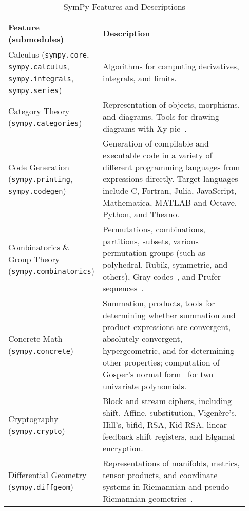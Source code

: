\begin{longtable}[htbc]{>{\raggedright}p{0.30\linewidth}p{0.63\linewidth}}
\caption{SymPy Features and Descriptions\label{features-table}}\\
\toprule
\textbf{Feature (submodules)} & \textbf{Description} \\
\midrule
Calculus (\texttt{sympy.core}, \texttt{sympy.calculus}, \texttt{sympy.integrals}, \texttt{sympy.series}) & Algorithms for computing derivatives, integrals, and limits.\\

Category Theory (\texttt{sympy.categories}) & Representation of objects, morphisms, and diagrams. Tools
for drawing diagrams with Xy-pic~\cite{rose1999xy}.\\

Code Generation (\texttt{sympy.printing}, \texttt{sympy.codegen}) & Generation of compilable and executable code in a
variety of different programming languages from expressions directly. Target
languages include C, Fortran, Julia, JavaScript,
Mathematica, MATLAB and Octave, Python, and Theano.\\

Combinatorics \& Group Theory (\texttt{sympy.combinatorics}) & Permutations, combinations,
partitions, subsets, various permutation groups (such as polyhedral, Rubik,
symmetric, and others), Gray codes~\cite{Nijenhuis1978combinatorial},
and Prufer sequences~\cite{biggs1976graph}.\\

Concrete Math (\texttt{sympy.concrete}) & Summation, products, tools for determining whether summation
and product expressions are convergent, absolutely convergent, hypergeometric,
and for determining other properties; computation of Gosper's normal form~\cite{petkovvsek1996bak} for two univariate polynomials.\\

Cryptography (\texttt{sympy.crypto}) & Block and stream ciphers, including shift, Affine,
substitution, Vigen\`{e}re's, Hill's, bifid, RSA, Kid RSA,
linear-feedback shift registers, and Elgamal encryption.\\

Differential Geometry (\texttt{sympy.diffgeom}) & Representations of manifolds, metrics, tensor
products, and coordinate systems in Riemannian and pseudo-Riemannian
geometries~\cite{FunctionalDifferentialGeometry}.\\


\end{longtable}
